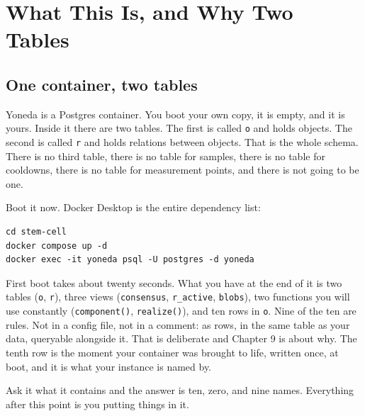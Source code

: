 \chapter{What This Is, and Why Two Tables}

\section{One container, two tables}

Yoneda is a Postgres container. You boot your own copy, it is empty, and it is yours. Inside it there are two tables. The first is called \texttt{o} and holds objects. The second is called \texttt{r} and holds relations between objects. That is the whole schema. There is no third table, there is no table for samples, there is no table for cooldowns, there is no table for measurement points, and there is not going to be one.

Boot it now. Docker Desktop is the entire dependency list:

\begin{verbatim}
cd stem-cell
docker compose up -d
docker exec -it yoneda psql -U postgres -d yoneda
\end{verbatim}

First boot takes about twenty seconds. What you have at the end of it is two tables (\texttt{o}, \texttt{r}), three views (\texttt{consensus}, \texttt{r\_active}, \texttt{blobs}), two functions you will use constantly (\texttt{component()}, \texttt{realize()}), and ten rows in \texttt{o}. Nine of the ten are rules. Not in a config file, not in a comment: as rows, in the same table as your data, queryable alongside it. That is deliberate and Chapter 9 is about why. The tenth row is the moment your container was brought to life, written once, at boot, and it is what your instance is named by.

Ask it what it contains and the answer is ten, zero, and nine names. Everything after this point is you putting things in it.

